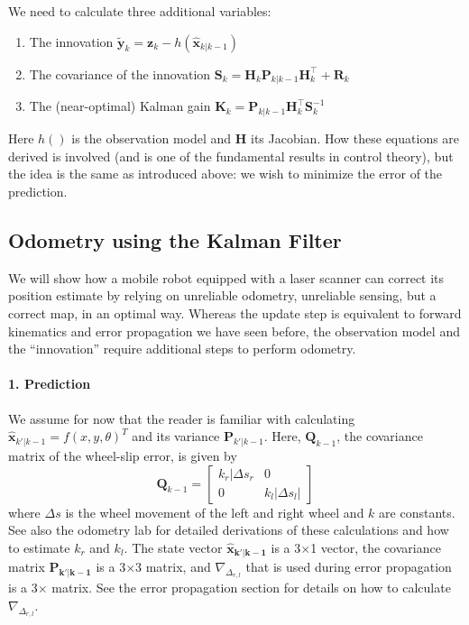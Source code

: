 We need to calculate three additional variables:
\begin{enumerate}
\item The innovation $ \tilde{\boldsymbol{y}}_{k}=\boldsymbol{z}_{k}-h(\hat{\boldsymbol{x}}_{k|k-1})$
\item The covariance of the innovation $\boldsymbol{S}_{k}={\boldsymbol{H}_{k}}\boldsymbol{P}_{k|k-1}{\boldsymbol{H}_{k}^\top}+\boldsymbol{R}_{k}$
\item The (near-optimal)  Kalman gain $ \boldsymbol{K}_{k}=\boldsymbol{P}_{k|k-1}{\boldsymbol{H}_{k}^\top}\boldsymbol{S}_{k}^{-1}$
\end{enumerate}
Here $ h()$ is the observation model and $ \boldsymbol{H}$ its Jacobian. How these equations are derived is involved (and is one of the fundamental results in control theory), but the idea is the same as introduced above: we wish to minimize the error of the prediction.

\subsection{Odometry using the Kalman Filter}
We will show how a mobile robot equipped with a laser scanner can correct its position estimate by relying on unreliable odometry, unreliable sensing, but a correct map, in an optimal way.
Whereas the update step is equivalent to forward kinematics and error propagation we have seen before, the observation model and the ``innovation'' require additional steps to perform odometry.

\paragraph{1. Prediction}
We assume for now that the reader is familiar with calculating $ \hat{\boldsymbol{x}}_{k'|k-1}=f(x,y,\theta)^T$ and its variance $ \boldsymbol{P}_{k'|k-1}$. Here, $ \boldsymbol{Q}_{k-1}$, the covariance matrix of the wheel-slip error,  is given by
\begin{equation}
\boldsymbol{Q}_{k-1}=\left[\begin{array}{cc}k_r|\Delta s_r & 0\\0 & k_l|\Delta s_l|\end{array}\right]
\end{equation}
where $ \Delta s$ is the wheel movement of the left and right wheel and $ k$ are constants. See also the odometry lab for detailed derivations of these calculations and how to estimate $ k_r$ and $ k_l$.  The state vector $ \boldsymbol{\hat{x}_{k'|k-1}}$ is a 3$\times$1 vector, the covariance matrix $ \boldsymbol{P_{k'|k-1}}$ is a 3$\times$3 matrix, and $ \nabla_{\Delta_{r,l}}$ that is used during error propagation is a 3$\times$ matrix. See the error propagation section for details on how to calculate $ \nabla_{\Delta_{r,l}}$.

